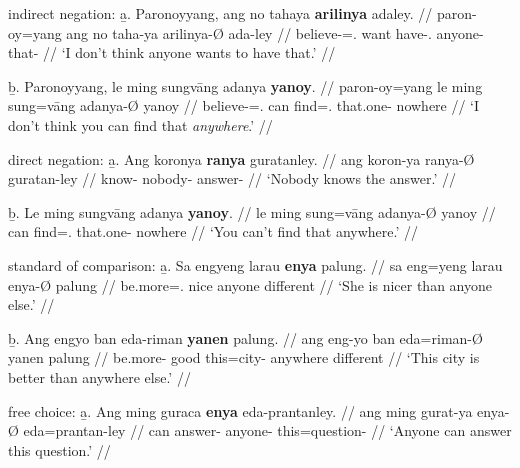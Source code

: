\a indirect negation:\vspace{.5em} %
	\beginsubsub
	\b{a.} \begingl
		\gla Paronoyyang, ang no tahaya \textbf{arilinya} adaley. //
		\glb paron-oy=yang ang no taha-ya arilinya-Ø ada-ley //
		\glc believe-\Neg{}=\Fsg{}.\Aarg{} \AgtT{} want 
			have-\Tsg{}.\M{} anyone-\Top{} that-\PargI{} //
		\glft `I don't think anyone wants to have that.' //
		\endgl\vspace{.5em}
	
	\b{b.} \begingl
		\gla Paronoyyang, le ming sungvāng adanya \textbf{yanoy}. //
		\glb paron-oy=yang le ming sung=vāng adanya-Ø yanoy //
		\glc believe-\Neg{}=\Fsg{}.\Aarg{} \PatTI{} can 
			find=\Ssg{}.\Aarg{} that.one-\Top{} nowhere //
		\glft `I don't think you can find that \emph{anywhere}.' //
		\endgl
	\endsubsub

\a direct negation:\vspace{.5em} %
	\beginsubsub
	\b{a.} \begingl
		\gla Ang koronya \textbf{ranya} guratanley. //
		\glb ang koron-ya ranya-Ø guratan-ley //
		\glc \AgtT{} know-\TsgM{} nobody-\Top{} answer-\PargI{} //
		\glft `Nobody knows the answer.' //
		\endgl\vspace{.5em}
		
	\b{b.} \begingl
		\gla Le ming sungvāng adanya \textbf{yanoy}. //
		\glb le ming sung=vāng adanya-Ø yanoy //
		\glc \PatTI{} can find=\Ssg{}.\Aarg{} that.one-\Top{} nowhere //
		\glft `You can't find that anywhere.' //
		\endgl
	\endsubsub

\a standard of comparison:\vspace{.5em} %
	\beginsubsub
	\b{a.} \begingl
		\gla Sa engyeng larau \textbf{enya} palung. //
		\glb sa eng=yeng larau enya-Ø palung //
		\glc \PatT{} be.more=\TsgF{}.\Aarg{} nice anyone different //
		\glft `She is nicer than anyone else.' //
		\endgl\vspace{.5em}
		
	\b{b.} \begingl
		\gla Ang engyo ban eda-riman \textbf{yanen} palung. //
		\glb ang eng-yo ban eda=riman-Ø yanen palung //
		\glc \AgtT{} be.more-\TsgN{} good this=city-\Top{} anywhere 
			different //
		\glft `This city is better than anywhere else.' //
		\endgl
	\endsubsub

\a free choice:\vspace{.5em} %
	\beginsubsub
	\b{a.} \begingl
		\gla Ang ming guraca \textbf{enya} eda-prantanley. //
		\glb ang ming gurat-ya enya-Ø eda=prantan-ley //
		\glc \AgtT{} can answer-\TsgM{} anyone-\Top{} 
				this=question-\PargI{} //
		\glft `Anyone can answer this question.' //
		\endgl\vspace{.5em}
		
